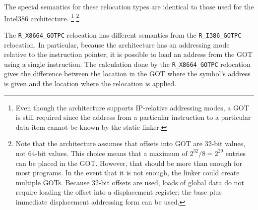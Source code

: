 The special semantics for these relocation types are identical to
those used for the Intel386 architecture.
\footnote{Even though the \xARCH architecture supports IP-relative
  addressing modes, a GOT is still required since the address from
  a particular instruction to a particular data item cannot be
  known by the static linker.}
\footnote{Note that the \xARCH architecture assumes that offsets into
  GOT are 32-bit values, not 64-bit values.  This choice means that a
  maximum of $2^{32}/8 = 2^{29}$ entries can be placed in the GOT.
  However, that should be more than enough for most programs.  In the
  event that it is not enough, the linker could create multiple GOTs.
  Because 32-bit offsets are used, loads of global data do not require
  loading the offset into a displacement register; the base plus
  immediate displacement addressing form can be used.}

The \texttt{R_X8664_GOTPC} relocation has different semantics from the
\texttt{R_I386_GOTPC} relocation.  In particular, because the \xARCH
architecture has an addressing mode relative to the instruction
pointer, it is possible to load an address from the GOT using a single
instruction.  The calculation done by the \texttt{R_X8664_GOTPC}
relocation gives the difference between the location in the GOT where
the symbol's address is given and the location where the relocation is
applied.

